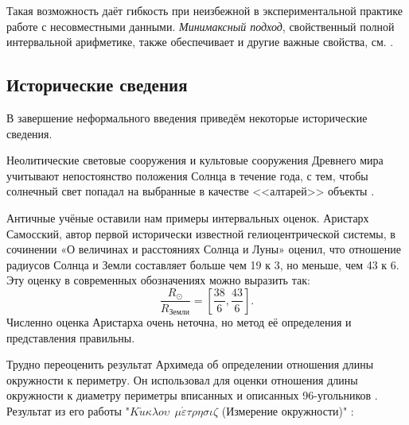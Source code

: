 \documentclass[a5paper,openany]{book}
\newcommand{\mbf}[1]{\protect\text{\boldmath$#1$}}
\begin{document}
Такая возможность даёт гибкость при неизбежной в экспериментальной практике работе с несовместными данными. \emph{Минимаксный подход}, свойственный полной интервальной арифметике, также обеспечивает и другие важные свойства, см. \cite{SharyBook}. 


\subsection{Исторические сведения}

В завершение неформального введения приведём некоторые исторические сведения.

Неолитические световые сооружения и культовые сооружения Древнего мира учитывают непостоянство положения Солнца в течение года, с тем, чтобы солнечный свет попадал на выбранные в качестве <<алтарей>> объекты \cite{OpticsHistory}.  

Античные учёные оставили нам примеры интервальных оценок. 
Аристарх Самосский, автор первой исторически известной гелиоцентрической системы, в сочинении «О величинах и расстояниях Солнца и Луны» \cite{Veselovcky1961} оценил, что отношение радиусов Солнца и Земли составляет больше чем 19 к 3, но меньше, чем 43 к 6. Эту оценку в современных обозначениях можно выразить так: 
\begin{equation*}
\frac{R_{\odot}}{R_{\text{Земли}}} = \left[  \frac{38}{6}, \frac{43}{6}\right].
\end{equation*}
Численно оценка Аристарха очень неточна, но метод её определения и представления правильны.

Трудно переоценить результат Архимеда об определении отношения длины окружности к периметру. Он использовал для оценки отношения длины окружности к диаметру периметры вписанных и описанных 96-угольников \cite{Archimedes}. Результат из его работы "$K \acute{u} \kappa \lambda o \upsilon \ \  \mu \acute{\varepsilon} \tau \rho \eta \sigma \iota \zeta$ (Измерение окружности)" : 
\end{document}
